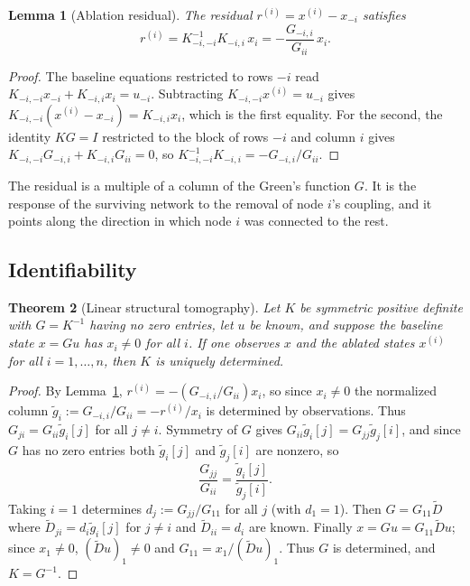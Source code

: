 \documentclass[11pt]{article}
\newtheorem{theorem}{Theorem}[section]
\newtheorem{lemma}[theorem]{Lemma}
\theoremstyle{definition}
\theoremstyle{remark}
\begin{document}
\begin{lemma}[Ablation residual]\label{lem:residual}
The residual $r^{(i)}=x^{(i)}-x_{-i}$ satisfies
\[
r^{(i)}=K_{-i,-i}^{-1}K_{-i,i}\,x_i=-\frac{G_{-i,i}}{G_{ii}}\,x_i .
\]
\end{lemma}
\begin{proof}
The baseline equations restricted to rows $-i$ read $K_{-i,-i}x_{-i}+K_{-i,i}x_i=u_{-i}$. Subtracting $K_{-i,-i}x^{(i)}=u_{-i}$ gives $K_{-i,-i}(x^{(i)}-x_{-i})=K_{-i,i}x_i$, which is the first equality. For the second, the identity $KG=I$ restricted to the block of rows $-i$ and column $i$ gives $K_{-i,-i}G_{-i,i}+K_{-i,i}G_{ii}=0$, so $K_{-i,-i}^{-1}K_{-i,i}=-G_{-i,i}/G_{ii}$.
\end{proof}

The residual is a multiple of a column of the Green's function $G$. It is the response of the surviving network to the removal of node $i$'s coupling, and it points along the direction in which node $i$ was connected to the rest.

\subsection{Identifiability}

\begin{theorem}[Linear structural tomography]\label{thm:tomo}
Let $K$ be symmetric positive definite with $G=K^{-1}$ having no zero entries, let $u$ be known, and suppose the baseline state $x=Gu$ has $x_i\ne 0$ for all $i$. If one observes $x$ and the ablated states $x^{(i)}$ for all $i=1,\dots,n$, then $K$ is uniquely determined.
\end{theorem}
\begin{proof}
By Lemma~\ref{lem:residual}, $r^{(i)}=-(G_{-i,i}/G_{ii})x_i$, so since $x_i\ne 0$ the normalized column $\tilde g_i:=G_{-i,i}/G_{ii}=-r^{(i)}/x_i$ is determined by observations. Thus $G_{ji}=G_{ii}\tilde g_i[j]$ for all $j\ne i$. Symmetry of $G$ gives $G_{ii}\tilde g_i[j]=G_{jj}\tilde g_j[i]$, and since $G$ has no zero entries both $\tilde g_i[j]$ and $\tilde g_j[i]$ are nonzero, so
\[
\frac{G_{jj}}{G_{ii}}=\frac{\tilde g_i[j]}{\tilde g_j[i]}.
\]
Taking $i=1$ determines $d_j:=G_{jj}/G_{11}$ for all $j$ (with $d_1=1$). Then $G=G_{11}\tilde D$ where $\tilde D_{ji}=d_i\tilde g_i[j]$ for $j\ne i$ and $\tilde D_{ii}=d_i$ are known. Finally $x=Gu=G_{11}\tilde Du$; since $x_1\ne0$, $(\tilde Du)_1\ne 0$ and $G_{11}=x_1/(\tilde Du)_1$. Thus $G$ is determined, and $K=G^{-1}$.
\end{proof}
\end{document}
